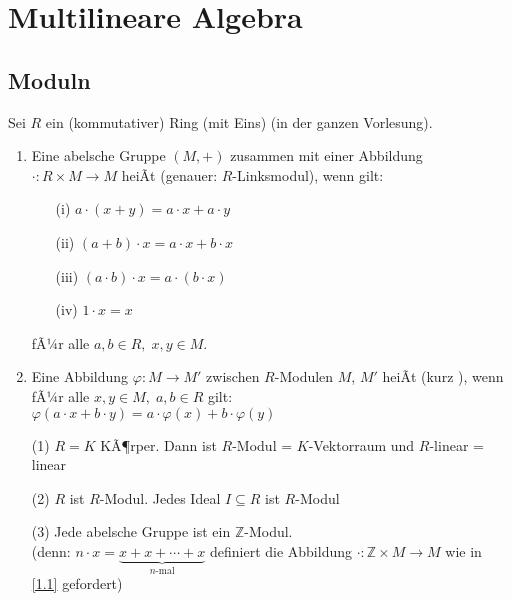 \chapter{Multilineare Algebra}

\section{Moduln}

Sei $R$ ein (kommutativer) Ring (mit Eins) (in der ganzen Vorlesung).

\begin{Def}
\label{1.1}
  \begin{enumerate}
    \item Eine abelsche Gruppe $(M,+)$ zusammen mit einer Abbildung
          $\cdot : R \times M \to M$ heiÃt  (genauer:
          $R$-Linksmodul), wenn gilt:
          \begin{enumerate}
            \item[(i)] $a \cdot (x+y) = a \cdot x + a \cdot y$
            \item[(ii)] $(a+b) \cdot x = a \cdot x + b \cdot x$
            \item[(iii)] $(a \cdot b) \cdot x = a \cdot (b \cdot x)$
            \item[(iv)] $1 \cdot x = x$
          \end{enumerate}
          fÃ¼r alle $a,b \in R,\;x,y \in M$.
    \item Eine Abbildung $\varphi: M \to M'$ zwischen $R$-Modulen $M$, $M'$
          heiÃt  (kurz
          ), wenn fÃ¼r alle $x,y \in M, \; a,b \in R$
          gilt:\\
          $\varphi (a \cdot x + b \cdot y) = a \cdot \varphi (x) + b \cdot
          \varphi (y)$
  \end{enumerate}
\end{Def}

\begin{nnBsp}
  \begin{enumerate}
    \item[(1)] $R = K$ KÃ¶rper. Dann ist $R$-Modul = $K$-Vektorraum und
               $R$-linear = linear
    \item[(2)] $R$ ist $R$-Modul. Jedes Ideal $I \subseteq R$ ist $R$-Modul
    \item[(3)] Jede abelsche Gruppe ist ein $\mathbb{Z}$-Modul.\\
               (denn: $n \cdot x = \underbrace{x + x + \cdots + x}_{n\text{-mal}}$
               definiert die Abbildung $\cdot: \mathbb{Z} \times M \to M$
               wie in \ref{1.1} gefordert)
  \end{enumerate}
\end{nnBsp}

